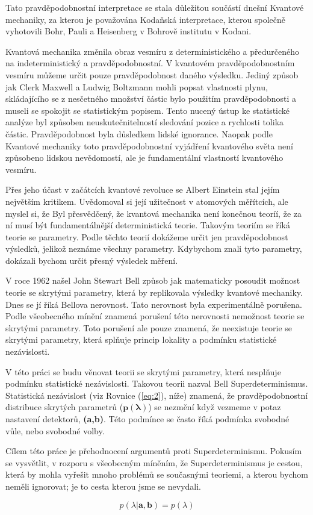 Tato pravděpodobnostní interpretace se stala důležitou součástí dnešní Kvantové mechaniky, za kterou je považována Kodaňská interpretace, kterou společně vyhotovili Bohr, Pauli a Heisenberg v Bohrově institutu v Kodani.

Kvantová mechanika změnila obraz vesmíru z deterministického a předurčeného na indeterministický a pravděpodobnostní. V kvantovém pravděpodobnostním vesmíru můžeme určit pouze pravděpodobnost daného výsledku. Jediný způsob jak Clerk Maxwell a Ludwig Boltzmann mohli popsat vlastnosti plynu, skládajícího se z nesčetného množství částic bylo použitím pravděpodob\-nosti a museli se spokojit se statistickým popisem. Tento nucený ústup ke statistické analýze byl způsoben neuskutečnitelností sledování pozice a rychlosti tolika částic. Pravděpodob\-nost byla důsledkem lidské ignorance. Naopak podle Kvantové mechaniky toto pravděpodobnost\-ní vyjádření kvantového světa není způsobeno lidskou nevědomostí, ale je fundamentální vlastností kvantového vesmíru.

Přes jeho účast v začátcích kvantové revoluce se Albert Einstein stal jejím největším kritikem. Uvědomoval si její užitečnost v atomových měřítcích, ale myslel si, že  Byl přesvědčený, že kvantová mechanika není konečnou teoríí, že za ní musí být fundamentálnější deterministická teorie. Takovým teoriím se říká teorie se  parametry. Podle těchto teorií dokážeme určit jen pravděpodobnost výsledků, jelikož neznáme všechny parametry. Kdybychom znali tyto  parametry, dokázali bychom určit přesný výsledek měření.

V roce 1962 našel John Stewart Bell způsob jak matematicky posoudit možnost teorie se skrytými parametry, která by replikovala výsledky kvantové mechaniky. Dnes se jí říká Bellova nerovnost. Tato nerovnost byla experimentálně porušena. Podle všeobecného mínění znamená porušení této nerovnosti nemožnost teorie se skrytými parametry. Toto porušení ale pouze znamená, že neexistuje teorie se skrytými parametry, která splňuje princip lokality a podmínku statistické nezávislosti.

V této práci se budu věnovat teorii se skrytými parametry, která nesplňuje podmínku statistické nezávislosti. Takovou teorii nazval Bell Superdeterminismus. Statistická nezávislost (viz Rovnice (\ref{eq:2}), níže) znamená, že pravděpodobnostní distribuce skrytých parametrů ($\bm{p(\lambda)}$) se nezmění když vezmeme v potaz nastavení detektorů, \textbf{(a,b)}. Této podmínce se často říká podmín\-ka svobodné vůle, nebo svobodné volby. 

Cílem této práce je přehodnocení argumentů proti Superdeterminismu. Pokusím se vysvětlit, v rozporu s všeobecným míněním, že Superdeterminismus je cestou, která by mohla vyřešit mnoho problémů se současnými teoriemi, a kterou bychom neměli ignorovat; je to cesta kterou jsme se nevydali.

\begin{equation}
    p(\lambda|\bm{a},\bm{b}) = p(\lambda) 
    \label{eq:2}
\end{equation}

